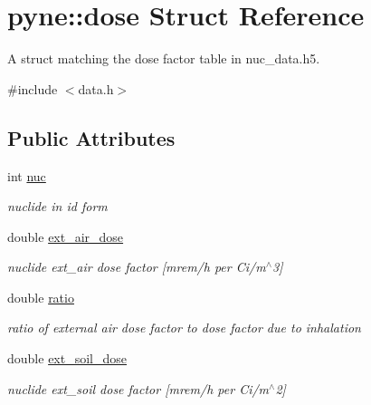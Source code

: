 \hypertarget{structpyne_1_1dose}{}\section{pyne\+:\+:dose Struct Reference}
\label{structpyne_1_1dose}


A struct matching the dose factor table in nuc\+\_\+data.\+h5.  




{\ttfamily \#include $<$data.\+h$>$}

\subsection*{Public Attributes}
\begin{DoxyCompactItemize}
\item 
\mbox{\label{structpyne_1_1dose_aecdcc915d5508f34715be42e13498d54}} 
int \hyperlink{structpyne_1_1dose_aecdcc915d5508f34715be42e13498d54}{nuc}
\begin{DoxyCompactList}\small\item\em nuclide in id form \end{DoxyCompactList}\item 
\mbox{\label{structpyne_1_1dose_af7640ca3a4d3fafc6c20575adca21c9e}} 
double \hyperlink{structpyne_1_1dose_af7640ca3a4d3fafc6c20575adca21c9e}{ext\+\_\+air\+\_\+dose}
\begin{DoxyCompactList}\small\item\em nuclide ext\+\_\+air dose factor \mbox{[}mrem/h per Ci/m$^\wedge$3\mbox{]} \end{DoxyCompactList}\item 
\mbox{\label{structpyne_1_1dose_a9b9e8557cee36daa2311b8fc98ccafd7}} 
double \hyperlink{structpyne_1_1dose_a9b9e8557cee36daa2311b8fc98ccafd7}{ratio}
\begin{DoxyCompactList}\small\item\em ratio of external air dose factor to dose factor due to inhalation \end{DoxyCompactList}\item 
\mbox{\label{structpyne_1_1dose_abca204cb7ae075e3d9bafcc8b030e23d}} 
double \hyperlink{structpyne_1_1dose_abca204cb7ae075e3d9bafcc8b030e23d}{ext\+\_\+soil\+\_\+dose}
\begin{DoxyCompactList}\small\item\em nuclide ext\+\_\+soil dose factor \mbox{[}mrem/h per Ci/m$^\wedge$2\mbox{]} \end{DoxyCompactList}\item 

\end{DoxyCompactItemize}
